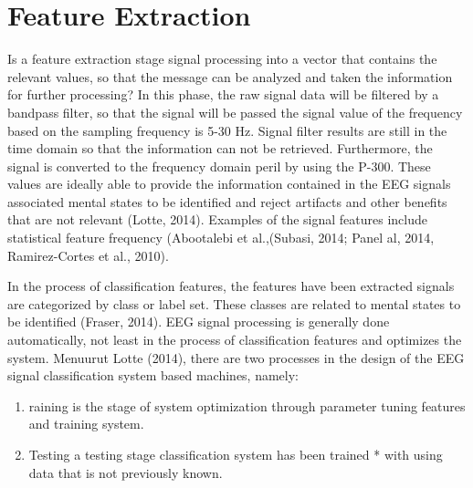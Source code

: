 \section{Feature Extraction}
\par
Is a feature extraction stage signal processing into a vector that contains the relevant values, so that the message can be analyzed and taken the information for further processing? In this phase, the raw signal data will be filtered by a bandpass filter, so that the signal will be passed the signal value of the frequency based on the sampling frequency is 5-30 Hz. Signal filter results are still in the time domain so that the information can not be retrieved. Furthermore, the signal is converted to the frequency domain peril by using the P-300. These values are ideally able to provide the information contained in the EEG signals associated mental states to be identified and reject artifacts and other benefits that are not relevant (Lotte, 2014). Examples of the signal features include statistical feature frequency (Abootalebi et al.,(Subasi, 2014; Panel al, 2014, Ramirez-Cortes et al., 2010).
\par
In the process of classification features, the features have been extracted signals are categorized by class or label set. These classes are related to mental states to be identified (Fraser, 2014). EEG signal processing is generally done automatically, not least in the process of classification features and optimizes the system. Menuurut Lotte (2014), there are two processes in the design of the EEG signal classification system based machines, namely:

\begin{enumerate}
    \item raining is the stage of system optimization through parameter tuning features and training system.
    \item Testing a testing stage classification system has been trained * with using data that is not previously known.
\end{enumerate}

